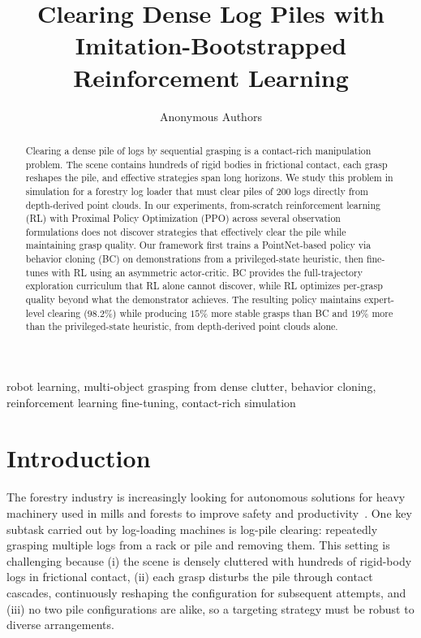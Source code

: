 \documentclass[conference]{IEEEtran}
\title{Clearing Dense Log Piles with Imitation-Bootstrapped Reinforcement Learning}
\author{
Anonymous Authors
}
\begin{document}
\maketitle

\begin{abstract}
Clearing a dense pile of logs by sequential grasping is a contact-rich manipulation problem. The scene contains hundreds of rigid bodies in frictional contact, each grasp reshapes the pile, and effective strategies span long horizons.
We study this problem in simulation for a forestry log loader that must clear piles of 200 logs directly from depth-derived point clouds.
In our experiments, from-scratch reinforcement learning (RL) with Proximal Policy Optimization (PPO) across several observation formulations does not discover strategies that effectively clear the pile while maintaining grasp quality.
Our framework first trains a PointNet-based policy via behavior cloning (BC) on demonstrations from a privileged-state heuristic, then fine-tunes with RL using an asymmetric actor-critic.
BC provides the full-trajectory exploration curriculum that RL alone cannot discover, while RL optimizes per-grasp quality beyond what the demonstrator achieves.
The resulting policy maintains expert-level clearing ($98.2$\%) while producing $15$\% more stable grasps than BC and $19$\% more than the privileged-state heuristic, from depth-derived point clouds alone.
\end{abstract}

\begin{IEEEkeywords}
robot learning, multi-object grasping from dense clutter, behavior cloning, reinforcement learning fine-tuning, contact-rich simulation
\end{IEEEkeywords}

\section{Introduction}
The forestry industry is increasingly looking for autonomous solutions for heavy machinery used in mills and forests to improve safety and productivity~\cite{lindroos2015forestry}.
One key subtask carried out by log-loading machines is log-pile clearing: repeatedly grasping multiple logs from a rack or pile and removing them.
This setting is challenging because (i) the scene is densely cluttered with hundreds of rigid-body logs in frictional contact, (ii) each grasp disturbs the pile through contact cascades, continuously reshaping the configuration for subsequent attempts, and (iii) no two pile configurations are alike, so a targeting strategy must be robust to diverse arrangements.
\end{document}
